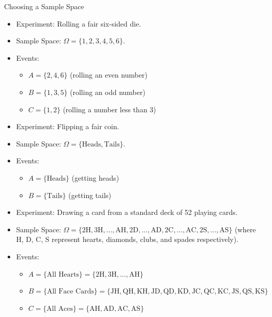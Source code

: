 \begin{itemize}
\begin{exampleboxbreak}{Choosing a Sample Space}
\begin{itemize}
    \item Experiment: Rolling a fair six-sided die.
    \item Sample Space: \( \Omega = \{1, 2, 3, 4, 5, 6\} \).
    \item Events:
    \begin{itemize}
        \item \( A = \{2, 4, 6\} \) (rolling an even number)
        \item \( B = \{1, 3, 5\} \) (rolling an odd number)
        \item \( C = \{1, 2\} \) (rolling a number less than 3)
    \end{itemize}
\end{itemize}   
\begin{itemize}
    \item Experiment: Flipping a fair coin.
    \item Sample Space: \( \Omega = \{\text{Heads}, \text{Tails}\} \).
    \item Events:
    \begin{itemize}
        \item \( A = \{\text{Heads}\} \) (getting heads)
        \item \( B = \{\text{Tails}\} \) (getting tails)
    \end{itemize}
\end{itemize}
\begin{itemize} 
    \item Experiment: Drawing a card from a standard deck of 52 playing cards.
    \item Sample Space: \( \Omega = \{\text{2H}, \text{3H}, \ldots, \text{AH}, \text{2D}, \ldots, \text{AD}, \text{2C}, \ldots, \text{AC}, \text{2S}, \ldots, \text{AS}\} \) (where H, D, C, S represent hearts, diamonds, clubs, and spades respectively).
    \item Events:
    \begin{itemize}
        \item \( A = \{\text{All Hearts}\} = \{\text{2H}, \text{3H}, \ldots, \text{AH}\} \)
        \item \( B = \{\text{All Face Cards}\} = \{\text{JH}, \text{QH}, \text{KH}, \text{JD}, \text{QD}, \text{KD}, \text{JC}, \text{QC}, \text{KC}, \text{JS}, \text{QS}, \text{KS}\} \)
        \item \( C = \{\text{All Aces}\} = \{\text{AH}, \text{AD}, \text{AC}, \text{AS}\} \)
    \end{itemize}
\end{itemize}
\end{exampleboxbreak}


\end{itemize}
